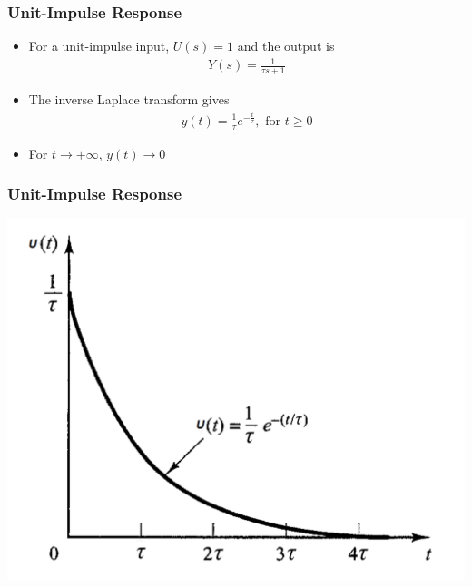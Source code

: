 \begin{frame}
\frametitle{Unit-Impulse Response}

\begin{itemize}
\item For a unit-impulse input, $U(s)=1$ and the output is
\vspace{0.2cm}
\\ 
\begin{align*}
Y(s)=\frac{1}{\tau s +1}
\end{align*}
\vspace{0.2cm}
\item The inverse Laplace transform gives
\vspace{0.2cm}
\\
\begin{align*}
y(t)= \frac{1}{\tau}e^{-\frac{t}{\tau}} ,\text{ for } t \ge 0
\end{align*}
\vspace{0.2cm}
\item For $t\rightarrow +\infty$, $y(t)\rightarrow 0$

\end{itemize}
\end{frame}

\begin{frame}
\frametitle{Unit-Impulse Response}
\includegraphics[width=0.8\linewidth]{Afbeelding5}
\end{frame}


